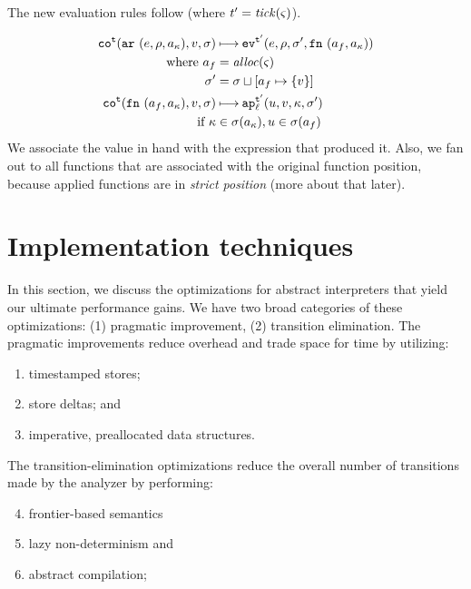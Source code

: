 \documentclass[preprint,onecolumn,9pt]{sigplanconf} %
\begin{document}
The new evaluation rules follow (where ${t}' = \mathit{tick}(\varsigma)$).

\newcommand{\ext}[3]{#1\sqcup[#2\mapsto#3]}

\begin{align*}
\co[^\mcntr]{\kar{\mexp,\menv,\maddr_\mkont},\mval,\msto} & \machstep
\ev[^{\mcntr'}]{\mexp,\menv,\msto',\kfn{\maddr_f,\maddr_\mkont}} \\
\text{ where }
  \maddr_f &= \alloc(\mstate) \\
  \msto' &= \ext{\msto}{\maddr_f}{\{\mval\}}
\\
\co[^\mcntr]{\kfn{\maddr_f,\maddr_\mkont},\mval,\msto} & \machstep
\ap[^{\mcntr'}_\mlab]{\mvalx{u},\mval,\mkont,\msto'}
\\
\text{ if } \mkont &\in \msto(\maddr_\mkont), \mvalx{u} \in \msto(\maddr_f)
\end{align*}
We associate the value in hand with the expression that produced
it. Also, we fan out to all functions that are associated with the
original function position, because applied functions are in
\emph{strict position} (more about that later).



\section{Implementation techniques}
\label{sec:opt}

In this section, we discuss the optimizations for abstract interpreters that
yield our ultimate performance gains.
%
We have two broad categories of these optimizations: (1) pragmatic
improvement, (2) transition elimination.
%
The pragmatic improvements reduce overhead and trade space for time
by utilizing:
\begin{enumerate}
 \item timestamped stores;
 \item store deltas; and
 \item imperative, preallocated data structures.
\end{enumerate}
The transition-elimination optimizations reduce the overall number of transitions
made by the analyzer by performing:
\begin{enumerate}
  \setcounter{enumi}{3}
 \item frontier-based semantics
 \item lazy non-determinism and
 \item abstract compilation;
\end{enumerate}
\end{document}
